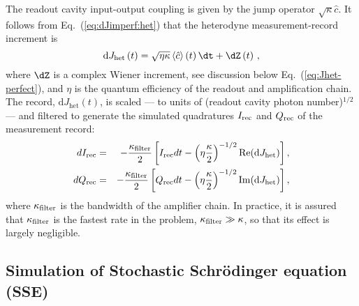 The readout cavity input-output coupling is given by the jump operator
$\sqrt{\kappa}\hat{c}$. It follows from Eq.~(\ref{eq:dJimperf:het})
that the heterodyne measurement-record increment is
\begin{equation}
\mathrm{d}J_{\mathrm{het}}\left(t\right)=\sqrt{\eta\kappa}\left\langle \hat{c}\right\rangle \left(t\right)\dt+\dZ\left(t\right)\,,\label{eq:Record}
\end{equation}
where $\dZ$ is a complex Wiener increment, see discussion below Eq.~(\ref{eq:Jhet-perfect}),
and $\eta$ is the quantum efficiency of the readout and amplification
chain. The record, $\mathrm{d}J_{\mathrm{het}}\left(t\right)$, is
scaled — to units of (readout cavity photon number)$^{1/2}$ — and
filtered to generate the simulated quadratures $I_{{\rm rec}}$ and
$Q_{{\rm rec}}$ of the measurement record: 
\begin{eqnarray}
dI_{{\rm rec}} & = & -\frac{\kappa_{{\rm filter}}}{2}\left[I_{{\rm rec}}dt-\left(\eta\frac{\kappa}{2}\right)^{-1/2}{\rm Re}(\mathrm{d}J_{\mathrm{het}})\right],\label{eqn:simulated_I_int}\\
dQ_{{\rm rec}} & = & -\frac{\kappa_{{\rm filter}}}{2}\left[Q_{{\rm rec}}dt-\left(\eta\frac{\kappa}{2}\right)^{-1/2}{\rm Im}(\mathrm{d}J_{\mathrm{het}})\right],\label{eqn:simulated_Q_int}
\end{eqnarray}
where $\kappa_{{\rm filter}}$ is the bandwidth of the amplifier chain.
In practice, it is assured that $\kappa_{{\rm filter}}$ is the fastest
rate in the problem, $\kappa_{{\rm filter}}\gg\kappa$, so that its
effect is largely negligible.  

\subsection{Simulation of Stochastic Schrödinger equation (SSE) \label{subsec:Simulation-of-linear}}

